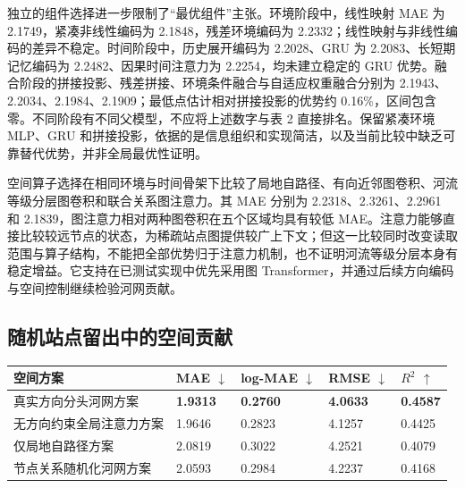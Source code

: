 \documentclass[UTF8,11pt,a4paper,fontset=none]{ctexart}
\begin{document}
独立的组件选择进一步限制了“最优组件”主张。环境阶段中，线性映射 MAE 为 2.1749，紧凑非线性编码为 2.1848，残差环境编码为 2.2332；线性映射与非线性编码的差异不稳定。时间阶段中，历史展开编码为 2.2028、GRU 为 2.2083、长短期记忆编码为 2.2482、因果时间注意力为 2.2254，均未建立稳定的 GRU 优势。融合阶段的拼接投影、残差拼接、环境条件融合与自适应权重融合分别为 2.1943、2.2034、2.1984、2.1909；最低点估计相对拼接投影的优势约 0.16\%，区间包含零。不同阶段有不同父模型，不应将上述数字与表 2 直接排名。保留紧凑环境 MLP、GRU 和拼接投影，依据的是信息组织和实现简洁，以及当前比较中缺乏可靠替代优势，并非全局最优性证明。


空间算子选择在相同环境与时间骨架下比较了局地自路径、有向近邻图卷积、河流等级分层图卷积和联合关系图注意力。其 MAE 分别为 2.2318、2.3261、2.2961 和 2.1839，图注意力相对两种图卷积在五个区域均具有较低 MAE。注意力能够直接比较较远节点的状态，为稀疏站点图提供较广上下文；但这一比较同时改变读取范围与算子结构，不能把全部优势归于注意力机制，也不证明河流等级分层本身有稳定增益。它支持在已测试实现中优先采用图 Transformer，并通过后续方向编码与空间控制继续检验河网贡献。


\par\noindent\begin{minipage}{\linewidth}

\subsection{随机站点留出中的空间贡献}

\begingroup\centering\small
\setlength{\tabcolsep}{3pt}
\captionsetup{hypcap=false}
\label{tab:5}
\begin{tabular}{L{7.500cm}C{1.827cm}C{2.019cm}C{1.923cm}C{1.731cm}}
\toprule
\textbf{空间方案} & \textbf{MAE $\downarrow$} & \textbf{log-MAE $\downarrow$} & \textbf{RMSE $\downarrow$} & \textbf{$R^2$ $\uparrow$} \\
\midrule
真实方向分头河网方案 & \textbf{1.9313} & \textbf{0.2760} & \textbf{4.0633} & \textbf{0.4587} \\
无方向约束全局注意力方案 & 1.9646 & 0.2823 & 4.1257 & 0.4425 \\
仅局地自路径方案 & 2.0819 & 0.3022 & 4.2521 & 0.4079 \\
节点关系随机化河网方案 & 2.0593 & 0.2984 & 4.2237 & 0.4168 \\
\bottomrule
\end{tabular}
\par\endgroup

\end{minipage}\par\medskip
\end{document}
